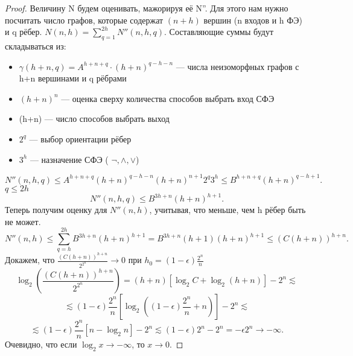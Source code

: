 \begin{proof}
Величину N будем оценивать, мажорируя её N''. Для этого нам нужно посчитать
число графов, которые содержат $(n+h)$ вершин (n входов и h ФЭ) и q рёбер.
$N(n,h) = \sum_{q=1}^{2h} N''(n, h, q).$ Составляющие суммы будут складываться
из:
\begin{itemize}
	\item $\gamma(h+n, q) = A^{h+n+q}\cdot (h+n)^{q-h-n}$ --- числа неизоморфных графов с h+n вершинами и q
		рёбрами
	\item  $(h+n)^n$ --- оценка сверху количества способов выбрать вход СФЭ
	\item (h+n) --- число способов выбрать выход
	\item $2^q$ --- выбор ориентации рёбер
	\item $3^h$ --- назначение СФЭ ( $\lnot, \land, \lor$)
\end{itemize}
\[
	N''(n, h, q) \le A^{h+n+q} (h+n)^{q-h-n} (h+n)^{n+1} 2^q 3^h\le
	B^{h+n+q} (h+n)^{q-h+1}
.\]
$q \le 2h$
 \[
	 N''(n, h, q) \le B^{3h+n} (h+n)^{h+1}
.\] 
Теперь получим оценку для $N''(n, h)$, учитывая, что меньше, чем h рёбер быть не
может.
 \[
	 N''(n, h) \le \sum_{q=h}^{2h} B^{3h+n} (h+n)^{h+1} =
	 B^{3h+n}(h+1)(h+n)^{h+1}\le (C(h+n))^{h+n}
.\]
Докажем, что $\frac{\left( C(h+n) \right)^{h+n} }{2^{2^n}} \to 0$ при $h_0 =
(1-\epsilon) \frac{2^n}{n}$ \[
	\log_2\left(  \frac{\left( C(h+n) \right)^{h+n} }{2^{2^n}} \right) =
\left( h+n \right) \left[\log_2C + \log_2(h+n)\right] - 2^n \lesssim \] \[\lesssim
	(1-\epsilon)\frac{2^n}{n} \left[ \log_2\left( (1-\epsilon) \frac{2^n}{n}
	+ n\right)  \right] - 2^n \lesssim \] \[\lesssim (1-\epsilon) \frac{2^n}{n} \left[
n - \log_2n \right] - 2^n \lesssim (1-\epsilon)2^n - 2^n = -\epsilon 2^n \to
-\infty
.\]
Очевидно, что если $\log_2x \to -\infty$, то $x\to 0$.

\end{proof}
